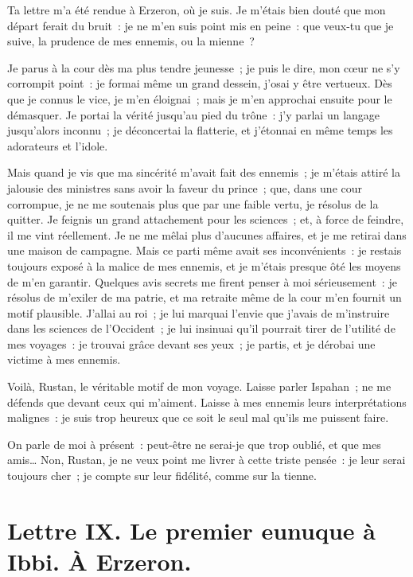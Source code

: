 \documentclass[french,twoside]{book} %
\newcommand{\dateline}[1]{\medskip{\RaggedLeft{#1}\par}\bigskip}
\begin{document}
\noindent Ta lettre m’a été rendue à Erzeron, où je suis. Je m’étais bien douté que mon départ ferait du bruit : je ne m’en suis point mis en peine : que veux-tu que je suive, la prudence de mes ennemis, ou la mienne ?\par
Je parus à la cour dès ma plus tendre jeunesse ; je puis le dire, mon cœur ne s’y corrompit point : je formai même un grand dessein, j’osai y être vertueux. Dès que je connus le vice, je m’en éloignai ; mais je m’en approchai ensuite pour le démasquer. Je portai la vérité jusqu’au pied du trône : j’y parlai un langage jusqu’alors inconnu ; je déconcertai la flatterie, et j’étonnai en même temps les adorateurs et l’idole.\par
Mais quand je vis que ma sincérité m’avait fait des ennemis ; je m’étais attiré la jalousie des ministres sans avoir la faveur du prince ; que, dans une cour corrompue, je ne me soutenais plus que par une faible vertu, je résolus de la quitter. Je feignis un grand attachement pour les sciences ; et, à force de feindre, il me vint réellement. Je ne me mêlai plus d’aucunes affaires, et je me retirai dans une maison de campagne. Mais ce parti même avait ses inconvénients : je restais toujours exposé à la malice de mes ennemis, et je m’étais presque ôté les moyens de m’en garantir. Quelques avis secrets me firent penser à moi sérieusement : je résolus de m’exiler de ma patrie, et ma retraite même de la cour m’en fournit un motif plausible. J’allai au roi ; je lui marquai l’envie que j’avais de m’instruire dans les sciences de l’Occident ; je lui insinuai qu’il pourrait tirer de l’utilité de mes voyages : je trouvai grâce devant ses yeux ; je partis, et je dérobai une victime à mes ennemis.\par
Voilà, Rustan, le véritable motif de mon voyage. Laisse parler Ispahan ; ne me défends que devant ceux qui m’aiment. Laisse à mes ennemis leurs interprétations malignes : je suis trop heureux que ce soit le seul mal qu’ils me puissent faire.\par
On parle de moi à présent : peut-être ne serai-je que trop oublié, et que mes amis… Non, Rustan, je ne veux point me livrer à cette triste pensée : je leur serai toujours cher ; je compte sur leur fidélité, comme sur la tienne.\par

\dateline{D’Erzeron, le 20 de la lune de Gemmadi 2, 1711.}
\section[{Lettre IX. Le premier eunuque à Ibbi. À Erzeron.}]{Lettre IX. Le premier eunuque à Ibbi. À Erzeron.}\renewcommand{\leftmark}{Lettre IX. Le premier eunuque à Ibbi. À Erzeron.}
\end{document}
